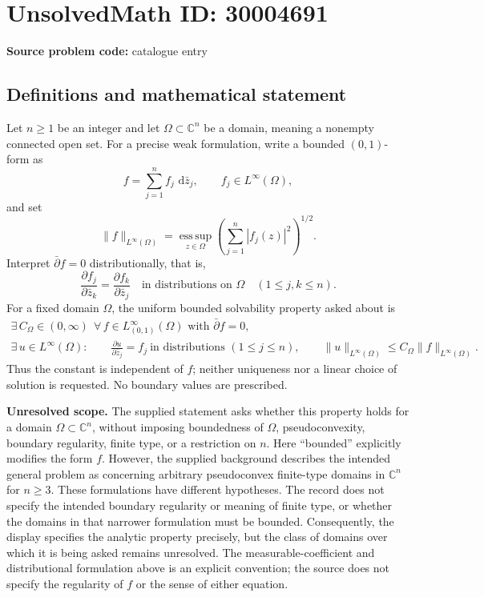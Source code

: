 \documentclass[11pt]{article}
\newcommand{\C}{\mathbb{C}}
\newcommand{\dd}{\,\mathrm{d}}
\begin{document}
\section*{UnsolvedMath ID: 30004691}
\textbf{Source problem code:} catalogue entry
\subsection{Definitions and mathematical statement}
Let \(n\geq 1\) be an integer and let \(\Omega\subset\C^n\) be a domain, meaning a nonempty connected open set. For a precise weak formulation, write a bounded \((0,1)\)-form as
\[
f=\sum_{j=1}^n f_j\,\dd\bar z_j,\qquad f_j\in L^\infty(\Omega),
\]
and set
\[
\|f\|_{L^\infty(\Omega)}=\operatorname*{ess\,sup}_{z\in\Omega}\left(\sum_{j=1}^n|f_j(z)|^2\right)^{1/2}.
\]
Interpret \(\bar\partial f=0\) distributionally, that is,
\[
\frac{\partial f_j}{\partial\bar z_k}=\frac{\partial f_k}{\partial\bar z_j}\quad\text{in distributions on }\Omega\quad(1\leq j,k\leq n).
\]
For a fixed domain \(\Omega\), the uniform bounded solvability property asked about is
\[
\begin{gathered}
\exists\,C_\Omega\in(0,\infty)\ \ \forall\,f\in L^\infty_{(0,1)}(\Omega)\text{ with }\bar\partial f=0,\\
\exists\,u\in L^\infty(\Omega):\qquad
\frac{\partial u}{\partial\bar z_j}=f_j\ \text{in distributions }(1\leq j\leq n),\qquad
\|u\|_{L^\infty(\Omega)}\leq C_\Omega\|f\|_{L^\infty(\Omega)}.
\end{gathered}
\]
Thus the constant is independent of \(f\); neither uniqueness nor a linear choice of solution is requested. No boundary values are prescribed.

\textbf{Unresolved scope.} The supplied statement asks whether this property holds for a domain \(\Omega\subset\C^n\), without imposing boundedness of \(\Omega\), pseudoconvexity, boundary regularity, finite type, or a restriction on \(n\). Here ``bounded'' explicitly modifies the form \(f\). However, the supplied background describes the intended general problem as concerning arbitrary pseudoconvex finite-type domains in \(\C^n\) for \(n\geq3\). These formulations have different hypotheses. The record does not specify the intended boundary regularity or meaning of finite type, or whether the domains in that narrower formulation must be bounded. Consequently, the display specifies the analytic property precisely, but the class of domains over which it is being asked remains unresolved. The measurable-coefficient and distributional formulation above is an explicit convention; the source does not specify the regularity of \(f\) or the sense of either equation.
\end{document}
